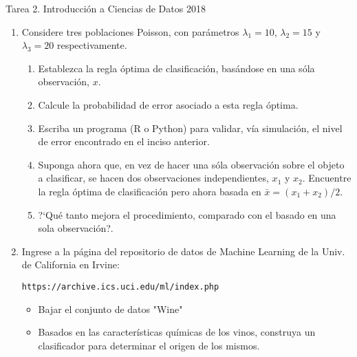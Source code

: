\documentclass{article}
\newcommand {\bc}{\begin{center}}
\newcommand {\ec}{\end{center}}
\begin{document}
\begin{sf}
\bc
{\Large Tarea 2. Introducci\'on a Ciencias de Datos 2018}
\ec

\bigskip

\begin{enumerate}
\item Considere tres poblaciones Poisson, con par\'ametros
$\lambda_1=10$, $\lambda_2=15$ y $\lambda_3=20$ respectivamente.
\begin{enumerate}
\item Establezca la regla \'optima de clasificaci\'on,
bas\'andose en una s\'ola observaci\'on, $x$.
\item Calcule la probabilidad de error asociado a esta regla \'optima.
\item Escriba un programa (R o Python) para validar, v\'ia simulaci\'on,
el nivel de error encontrado en el inciso anterior.
\item Suponga ahora que, en vez de hacer una s\'ola observaci\'on
sobre el objeto a clasificar, se hacen dos observaciones independientes,
$x_1$ y $x_2$. Encuentre la regla \'optima de clasificaci\'on
pero ahora basada en $\bar{x} = (x_1+x_2)/2$.
\item ?`Qu\'e tanto mejora el procedimiento, comparado con
el basado en una sola observaci\'on?.
\end{enumerate}


\bigskip

\item Ingrese a la p\'agina del repositorio de datos de Machine
Learning de la Univ. de 
California en Irvine:
\begin{center}
\texttt{https://archive.ics.uci.edu/ml/index.php}
\end{center}
\begin{itemize}
\item Bajar el conjunto de datos "Wine"
\item Basados en las caracter\'isticas qu\'imicas de los vinos,
construya un clasificador para determinar el origen de los mismos.
\end{itemize}




\bigskip





\end{enumerate}
\end{sf}
\end{document}
